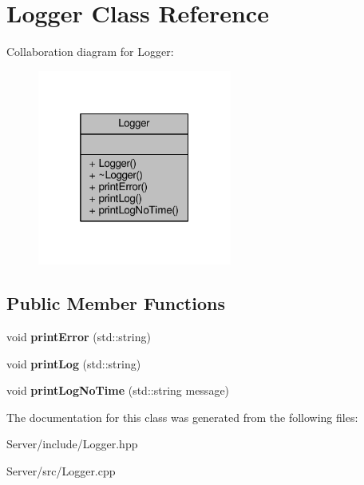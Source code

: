 \hypertarget{class_logger}{}\section{Logger Class Reference}
\label{class_logger}


Collaboration diagram for Logger\+:\nopagebreak
\begin{figure}[H]
\begin{center}
\leavevmode
\includegraphics[width=181pt]{de/d85/class_logger__coll__graph}
\end{center}
\end{figure}
\subsection*{Public Member Functions}
\begin{DoxyCompactItemize}
\item 
void {\bfseries print\+Error} (std\+::string)\hypertarget{class_logger_aefe4bf1223e32f97183bc14a667b08f4}{}\label{class_logger_aefe4bf1223e32f97183bc14a667b08f4}

\item 
void {\bfseries print\+Log} (std\+::string)\hypertarget{class_logger_a7914922b4c085ff36fadea6121297758}{}\label{class_logger_a7914922b4c085ff36fadea6121297758}

\item 
void {\bfseries print\+Log\+No\+Time} (std\+::string message)\hypertarget{class_logger_ab4a90706c82ccc213d25c59c4be7b8f9}{}\label{class_logger_ab4a90706c82ccc213d25c59c4be7b8f9}

\end{DoxyCompactItemize}


The documentation for this class was generated from the following files\+:\begin{DoxyCompactItemize}
\item 
Server/include/Logger.\+hpp\item 
Server/src/Logger.\+cpp\end{DoxyCompactItemize}
